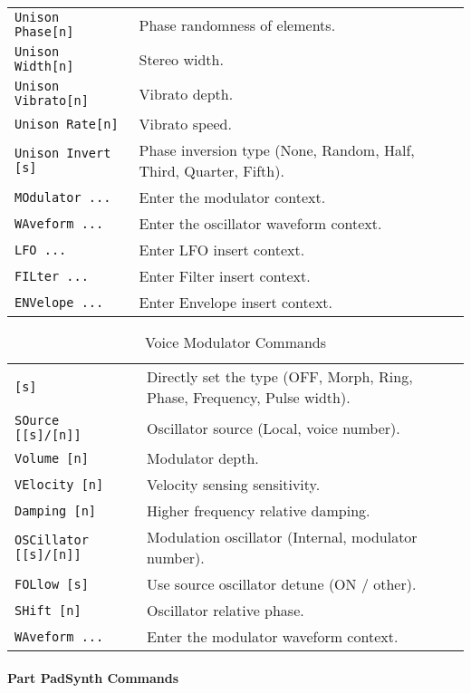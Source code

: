 \begin{table}[H]
\begin{tabular}{l l}
\texttt{Unison Phase[n]} &
   Phase randomness of elements. \\
\texttt{Unison Width[n]} &
   Stereo width. \\
\texttt{Unison Vibrato[n]} &
   Vibrato depth. \\
\texttt{Unison Rate[n]} &
   Vibrato speed. \\
\texttt{Unison Invert [s]} &
   Phase inversion type (None, Random, Half, Third, Quarter, Fifth). \\
\texttt{MOdulator ...} &
   Enter the modulator context. \\
\texttt{WAveform ...} &
   Enter the oscillator waveform context. \\
\texttt{LFO ...} &
   Enter LFO insert context.  \\
\texttt{FILter ...} &
   Enter Filter insert context.  \\
\texttt{ENVelope ...} &
   Enter Envelope insert context.   \\
      \end{tabular}
   \end{table}

   \begin{table}[H]
      \caption{Voice Modulator Commands}
      \label{table:yoshimi_part_addsynth_voice_modulator_commands}
      \begin{tabular}{l l}

\texttt{[s]} &
   Directly set the type (OFF, Morph, Ring, Phase, Frequency, Pulse width). \\
\texttt{SOurce [[s]/[n]]} &
   Oscillator source (Local, voice number). \\
\texttt{Volume [n]} &
   Modulator depth.  \\
\texttt{VElocity [n]} &
   Velocity sensing sensitivity. \\
\texttt{Damping [n]} &
   Higher frequency relative damping. \\
\texttt{OSCillator [[s]/[n]]} &
   Modulation oscillator (Internal, modulator number). \\
\texttt{FOLlow [s]} &
   Use source oscillator detune (ON / other). \\
\texttt{SHift [n]} &
   Oscillator relative phase. \\
\texttt{WAveform ...} &
   Enter the modulator waveform context. \\
      \end{tabular}
   \end{table}

\paragraph{Part PadSynth Commands}
\label{paragraph:command_line_part_padsynth_commands}

